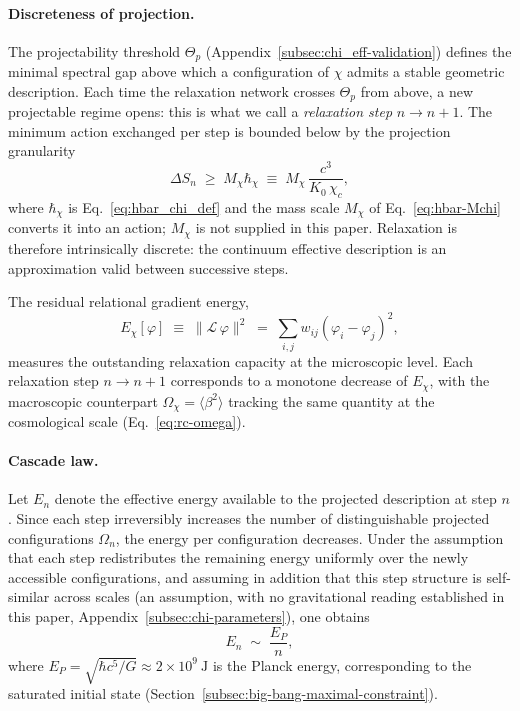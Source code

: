     \paragraph{Discreteness of projection.}
      The projectability threshold $\Theta_p$ (Appendix~\ref{subsec:chi_eff-validation}) defines the
      minimal spectral gap above which a configuration of $\chi$ admits a stable geometric description.
      Each time the relaxation network crosses $\Theta_p$ from above, a new
      projectable regime opens: this is what we call a \emph{relaxation step} $n \to n+1$.
      The minimum action exchanged per step is bounded below by the projection granularity
    \begin{equation}
      \label{eq:rc-delta-S}
      \Delta S_n \;\geq\; M_\chi\hbar_\chi
      \;\equiv\;
      M_\chi\,\frac{c^3}{K_0\,\chi_c},
      \end{equation}
      where $\hbar_\chi$ is Eq.~\eqref{eq:hbar_chi_def} and the mass scale $M_\chi$ of Eq.~\eqref{eq:hbar-Mchi}
      converts it into an action; $M_\chi$ is not supplied in this paper.
      Relaxation is therefore intrinsically discrete: the continuum effective
      description is an approximation valid between successive steps.

      The residual relational gradient energy,
    \begin{equation}
      \label{eq:relational-energy}
      E_\chi[\varphi] \;\equiv\; \|\mathcal{L}\,\varphi\|^2
      \;=\; \sum_{i,j} w_{ij}(\varphi_i - \varphi_j)^2,
      \end{equation}
      measures the outstanding relaxation capacity at the microscopic level.
      Each relaxation step $n \to n+1$ corresponds to a monotone decrease of
      $E_\chi$, with the macroscopic counterpart $\Omega_\chi = \langle\beta^2\rangle$
      tracking the same quantity at the cosmological scale
      (Eq.~\eqref{eq:rc-omega}).

    \paragraph{Cascade law.}
      Let $E_n$ denote the effective energy available to the projected description at step $n$.
      Since each step irreversibly increases the number of distinguishable
      projected configurations $\Omega_n$, the energy per configuration decreases.
      Under the assumption that each step redistributes the remaining energy
      uniformly over the newly accessible configurations, and assuming in addition that this step structure is
      self-similar across scales (an assumption, with no gravitational reading established in this paper,
      Appendix~\ref{subsec:chi-parameters}), one obtains
    \begin{equation}
      \label{eq:rc-cascade}
      E_n \;\sim\; \frac{E_P}{n},
      \end{equation}
      where $E_P = \sqrt{\hbar c^5/G} \approx 2 \times 10^9~\mathrm{J}$
      is the Planck energy, corresponding to the saturated initial state
      (Section~\ref{subsec:big-bang-maximal-constraint}).

